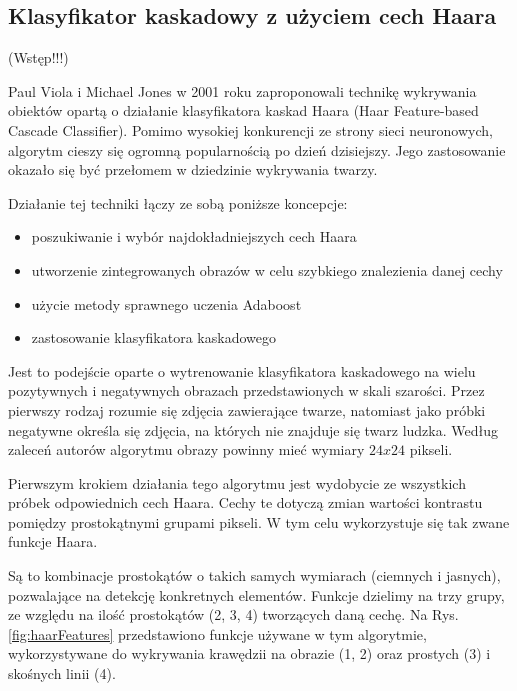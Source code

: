 \subsection{Klasyfikator kaskadowy z użyciem cech Haara}
(Wstęp!!!)

Paul Viola i Michael Jones w 2001 roku zaproponowali technikę wykrywania obiektów opartą o działanie klasyfikatora kaskad Haara (Haar Feature-based Cascade Classifier). Pomimo wysokiej konkurencji ze strony sieci neuronowych, algorytm cieszy się ogromną popularnością po dzień dzisiejszy. \cite{haarCascade}Jego zastosowanie okazało się być przełomem w dziedzinie wykrywania twarzy. 

Działanie tej techniki \cite{haar} łączy ze sobą poniższe koncepcje:
\begin{itemize}
    \item poszukiwanie i wybór najdokładniejszych cech Haara
    \item utworzenie zintegrowanych obrazów w celu szybkiego znalezienia danej cechy
    \item użycie metody sprawnego uczenia Adaboost
    \item zastosowanie klasyfikatora kaskadowego%
\end{itemize}

Jest to podejście oparte o wytrenowanie klasyfikatora kaskadowego na wielu pozytywnych i negatywnych obrazach przedstawionych w skali szarości. Przez pierwszy rodzaj rozumie się zdjęcia zawierające twarze, natomiast jako próbki negatywne określa się zdjęcia, na których nie znajduje się twarz ludzka. Według zaleceń autorów algorytmu obrazy powinny mieć wymiary $24x24$ pikseli.

Pierwszym krokiem działania tego algorytmu jest wydobycie ze wszystkich próbek odpowiednich cech Haara. Cechy te dotyczą zmian wartości kontrastu pomiędzy prostokątnymi grupami pikseli. W tym celu wykorzystuje się tak zwane funkcje Haara.

Są to kombinacje prostokątów  o takich samych wymiarach (ciemnych i jasnych), pozwalające na detekcję konkretnych elementów. Funkcje dzielimy na trzy grupy, ze względu na ilość prostokątów (2, 3, 4) tworzących daną cechę. Na Rys. \ref{fig:haarFeatures} przedstawiono funkcje używane w tym algorytmie, wykorzystywane do wykrywania krawędzii na obrazie (1, 2) oraz prostych (3) i skośnych linii (4).

